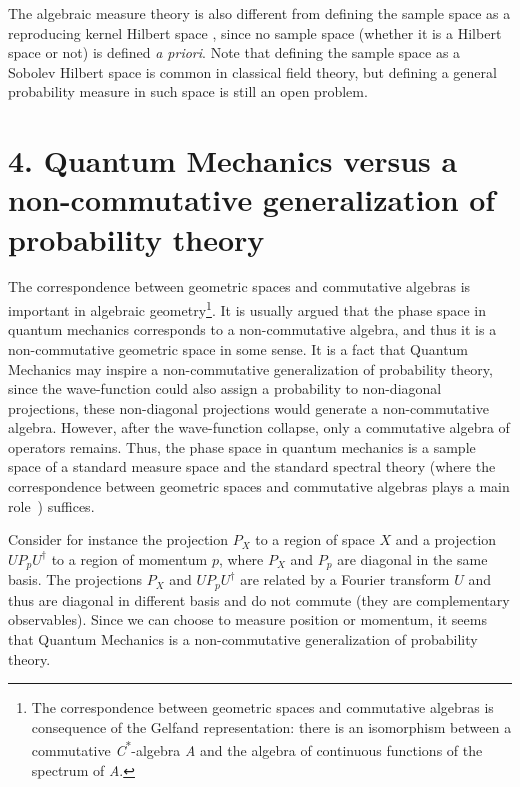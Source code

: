 \documentclass[11pt]{book}
\begin{document}
The algebraic measure theory is also different from defining the sample
space as a reproducing kernel Hilbert space
\cite{fukumizu2013kernel}\cite{10.5555ux2f3023638.3023648}, since no sample space (whether it is a
Hilbert space or not) is defined \emph{a priori}. Note that defining the
sample space as a Sobolev Hilbert space is common in classical field
theory\cite{leoni2009first}, but defining
a general probability measure in such space is still an open problem.

\hypertarget{quantum-mechanics-versus-a-non-commutative-generalization-of-probability-theory}{%
\section{4. Quantum Mechanics versus a non-commutative generalization of
probability
theory}\label{quantum-mechanics-versus-a-non-commutative-generalization-of-probability-theory}}

The correspondence between geometric spaces and commutative algebras is
important in algebraic geometry\footnote{The correspondence between
  geometric spaces and commutative algebras is consequence of the
  Gelfand representation: there is an isomorphism between a commutative
  {\emph{C}\textsuperscript{*}}-algebra {\emph{A}} and the algebra of
  continuous functions of the spectrum of {\emph{A}}.}. It is usually
argued that the phase space in quantum mechanics corresponds to a
non-commutative algebra, and thus it is a non-commutative geometric
space in some
sense\cite{Connes1995Noncommutative}. It
is a fact that Quantum Mechanics may inspire a non-commutative
generalization of probability theory, since the wave-function could also
assign a probability to non-diagonal projections, these non-diagonal
projections would generate a non-commutative
algebra\cite{Streater2000Classical}.
However, after the wave-function collapse, only a commutative algebra of
operators remains. Thus, the phase space in quantum mechanics is a
sample space of a standard measure space and the standard spectral
theory (where the correspondence between geometric spaces and
commutative algebras plays a main
role~\cite{Steen1973Highlights})
suffices.

Consider for instance the projection \(P_X\) to a region of space \(X\)
and a projection \(U P_p U^\dagger\) to a region of momentum \(p\),
where \(P_X\) and \(P_p\) are diagonal in the same basis. The
projections \(P_X\) and \(U P_p U^\dagger\) are related by a Fourier
transform \(U\) and thus are diagonal in different basis and do not
commute (they are complementary observables). Since we can choose to
measure position or momentum, it seems that Quantum Mechanics is a
non-commutative generalization of probability
theory\cite{Streater2000Classical}.
\end{document}
